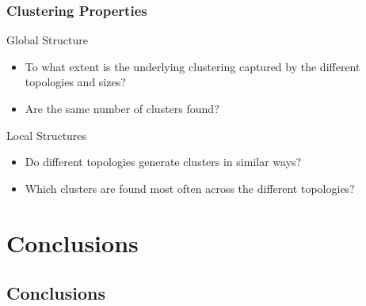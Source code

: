 \documentclass[nototal,handout]{beamer}
\begin{document}
\begin{frame}
	\frametitle{Clustering Properties}
 
\begin{block}{Global Structure}
 \begin{itemize}
 \item To what extent is the underlying clustering captured by the different topologies and sizes?
 \item  Are the same number of clusters found?
 \end{itemize}
 \end{block} 
\begin{block}{Local Structures}
 \begin{itemize}
 \item  Do different topologies generate clusters in similar ways?
 \item  Which clusters are found most often across the different topologies?
 \end{itemize}
 \end{block} \end{frame} 


\section{Conclusions} 

\subsection{Conclusions} 
\end{document}
